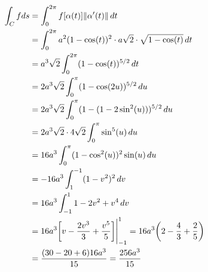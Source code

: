 \documentclass[../main.tex]{subfiles}
\begin{document}
\begin{solucao}
\begin{enumerate}
			\begin{align*}
				\int_C f ds
				&= \int_0^{2\pi} f[\alpha(t)]\|\alpha'(t)\|\, dt\\
				&= \int_0^{2\pi} a^2(1-\cos(t))^2\cdot a\sqrt{2}\cdot \sqrt{1-\cos(t)}\, dt\\
				&= a^3\sqrt{2}\int_0^{2\pi}(1-\cos(t))^{5/2}\, dt\\
				&= 2a^3\sqrt{2}\int_0^{\pi}(1-\cos(2u))^{5/2}\, du\\
				&= 2a^3\sqrt{2}\int_0^{\pi}(1-(1-2\sin^2(u)))^{5/2}\, du\\
				&= 2a^3\sqrt{2}\cdot 4\sqrt{2}\int_0^{\pi}\sin^5(u)\, du\\
				&= 16a^3\int_0^{\pi}(1-\cos^2(u))^2\sin(u)\, du\\
				&= -16a^3\int_1^{-1}(1-v^2)^2\, dv\\
				&= 16a^3\int_{-1}^{1}1-2v^2+v^4\, dv\\
				&= 16a^3\bigg[v-\frac{2v^3}{3}+\frac{v^5}{5}\bigg]\Biggr{|}_{-1}^1=16a^3\bigg(2-\frac{4}{3}+\frac{2}{5}\bigg)\\
				&= \frac{(30-20+6)16a^3}{15}=\frac{256a^3}{15}
			\end{align*}
		\end{enumerate}
	\end{solucao}
	
\end{document}
